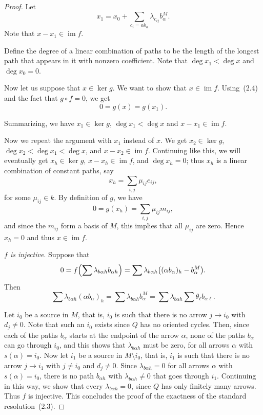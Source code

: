 \documentclass[11pt, a4paper]{report}
\begin{document}
\begin{proof}
        Let
        \[
        x_1=x_0+\sum_{c_i=\alpha b_\alpha}\lambda_{c_{ij}}b_\alpha^M.
        \]
        Note that $x-x_1\in \operatorname{im} f$.

        Define the degree of a linear combination of paths to be the length of the longest
        path that appears in it with nonzero coefficient. Note that $\deg x_1<\deg x$ and
        $\deg x_0=0$.

        Now let us suppose that $x\in \ker g$. We want to show that $x\in \operatorname{im} f$.
        Using~(2.4) and the fact that $g\circ f=0$, we get
        \[
        0=g(x)=g(x_1).
        \]

        Summarizing, we have $x_1\in \ker g$, $\deg x_1<\deg x$ and $x-x_1\in \operatorname{im} f$.

        Now we repeat the argument with $x_1$ instead of $x$. We get
        $x_2\in \ker g$, $\deg x_2<\deg x_1<\deg x$, and $x-x_2\in \operatorname{im} f$.
        Continuing like this, we will eventually get $x_h\in \ker g$, $x-x_h\in \operatorname{im} f$,
        and $\deg x_h=0$; thus $x_h$ is a linear combination of constant paths, say
        \[
        x_h=\sum_{i,j}\mu_{ij}e_{ij},
        \]
        for some $\mu_{ij}\in k$. By definition of $g$, we have
        \[
        0=g(x_h)=\sum_{i,j}\mu_{ij}m_{ij},
        \]
        and since the $m_{ij}$ form a basis of $M$, this implies that all $\mu_{ij}$ are zero.
        Hence $x_h=0$ and thus $x\in \operatorname{im} f$.

        \emph{$f$ is injective}. Suppose that
        \[
        0=f\Bigl(\sum \lambda_{b\alpha h}b_{\alpha h}\Bigr)
        =\sum \lambda_{b\alpha h}\bigl((\alpha b_\alpha)_h-b_\alpha^M\bigr).
        \]
        Then
        \[
        \sum \lambda_{b\alpha h}(\alpha b_\alpha)_h
        =
        \sum \lambda_{b\alpha h}b_\alpha^M
        =
        \sum \lambda_{b\alpha h}\sum \theta_\ell b_{\alpha \ell}.
        \]

        Let $i_0$ be a source in $M$, that is, $i_0$ is such that there is no arrow
        $j\to i_0$ with $d_j\neq 0$. Note that such an $i_0$ exists since $Q$ has no oriented
        cycles. Then, since each of the paths $b_\alpha$ starts at the endpoint of the arrow $\alpha$,
        none of the paths $b_\alpha$ can go through $i_0$, and this shows that
        $\lambda_{b\alpha h}$ must be zero, for all arrows $\alpha$ with $s(\alpha)=i_0$.
        Now let $i_1$ be a source in $M\setminus i_0$, that is, $i_1$ is such that there is
        no arrow $j\to i_1$ with $j\neq i_0$ and $d_j\neq 0$. Since $\lambda_{b\alpha h}=0$
        for all arrows $\alpha$ with $s(\alpha)=i_0$, there is no path $b_{\alpha h}$ with
        $\lambda_{b\alpha h}\neq 0$ that goes through $i_1$. Continuing in this way, we show that
        every $\lambda_{b\alpha h}=0$, since $Q$ has only finitely many arrows. Thus $f$ is injective.
        This concludes the proof of the exactness of the standard resolution~(2.3).
        \qedhere
        \end{proof}
\end{document}
